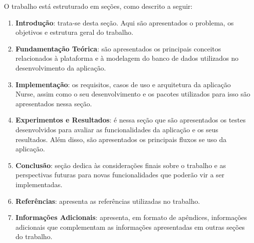 O trabalho está estruturado em seções, como descrito a seguir: 


  \begin{enumerate}[label=\textbf{Seção \arabic*}]
    \item \textbf{Introdução}: trata-se desta seção. Aqui são apresentados o problema, os objetivos e estrutura geral do trabalho.
    \item \textbf{Fundamentação Teórica}: são apresentados os principais conceitos relacionados à plataforma e à modelagem do banco de dados utilizados no desenvolvimento da aplicação.
    \item \textbf{Implementação}: os requisitos, casos de uso e arquitetura da aplicação Nurse, assim como o seu desenvolvimento e os pacotes utilizados para isso são apresentados nessa seção.
    \item \textbf{Experimentos e Resultados}: é nessa seção que são apresentados os testes desenvolvidos para avaliar as funcionalidades da aplicação e os seus resultados. Além disso, são apresentados os principais fluxos se uso da aplicação.
    \item \textbf{Conclusão}: seção dedica às considerações finais sobre o trabalho e as perspectivas futuras para novas funcionalidades que poderão vir a ser implementadas.
    \item \textbf{Referências}: apresenta as referências utilizadas no trabalho.
    \item \textbf{Informações Adicionais}: apresenta, em formato de apêndices, informações adicionais que complementam as informações apresentadas em outras seções do trabalho.
  \end{enumerate}



